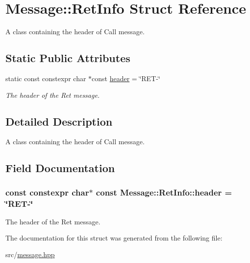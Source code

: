 \hypertarget{struct_message_1_1_ret_info}{}\section{Message\+:\+:Ret\+Info Struct Reference}
\label{struct_message_1_1_ret_info}


A class containing the header of Call message.  


\subsection*{Static Public Attributes}
\begin{DoxyCompactItemize}
\item 
static const constexpr char $\ast$const \hyperlink{struct_message_1_1_ret_info_a15d17cb758011b5e1b787a416ec8c32a}{header} = \char`\"{}R\+ET-\/\char`\"{}
\begin{DoxyCompactList}\small\item\em The header of the Ret message. \end{DoxyCompactList}\end{DoxyCompactItemize}


\subsection{Detailed Description}
A class containing the header of Call message. 

\subsection{Field Documentation}
\subsubsection[{\texorpdfstring{header}{header}}]{\setlength{\rightskip}{0pt plus 5cm}const constexpr char$\ast$ const Message\+::\+Ret\+Info\+::header = \char`\"{}R\+ET-\/\char`\"{}\hspace{0.3cm}{\ttfamily [static]}}\hypertarget{struct_message_1_1_ret_info_a15d17cb758011b5e1b787a416ec8c32a}{}\label{struct_message_1_1_ret_info_a15d17cb758011b5e1b787a416ec8c32a}


The header of the Ret message. 



The documentation for this struct was generated from the following file\+:\begin{DoxyCompactItemize}
\item 
src/\hyperlink{message_8hpp}{message.\+hpp}\end{DoxyCompactItemize}
